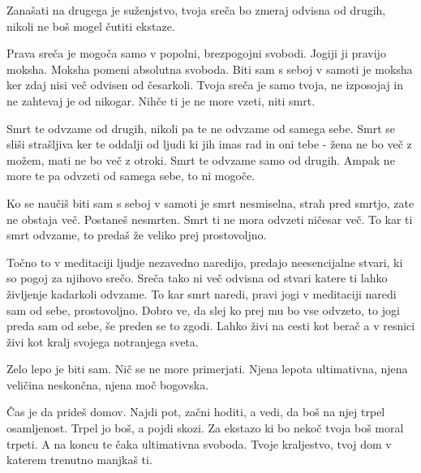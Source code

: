Zanašati na drugega je suženjstvo, tvoja sreča bo zmeraj odvisna od drugih, nikoli ne boš mogel čutiti ekstaze. 

Prava sreča je mogoča samo v popolni, brezpogojni svobodi. Jogiji ji pravijo moksha. Moksha pomeni absolutna svoboda. Biti sam s seboj v samoti je moksha ker zdaj nisi več odvisen od česarkoli. Tvoja sreča je samo tvoja, ne izposojaj in ne zahtevaj je od nikogar. Nihče ti je ne more vzeti, niti smrt. 

Smrt te odvzame od drugih, nikoli pa te ne odvzame od samega sebe. Smrt se sliši strašljiva ker te oddalji od ljudi ki jih imas rad in oni tebe - žena ne bo več z možem, mati ne bo več z otroki. Smrt te odvzame samo od drugih. Ampak ne more te pa odvzeti od samega sebe, to ni mogoče. 

Ko se naučiš biti sam s seboj v samoti je smrt nesmiselna, strah pred smrtjo, zate ne obstaja več. Postaneš nesmrten. Smrt ti ne mora odvzeti ničesar več. To kar ti smrt odvzame, to predaš že veliko prej prostovoljno. 

Točno to v meditaciji ljudje nezavedno naredijo, predajo neesencijalne stvari, ki so pogoj za njihovo srečo. Sreča tako ni več odvisna od stvari katere ti lahko življenje kadarkoli odvzame. To kar smrt naredi, pravi jogi v meditaciji naredi sam od sebe, prostovoljno. Dobro ve, da slej ko prej mu bo vse odvzeto, to jogi preda sam od sebe, še preden se to zgodi. Lahko živi na cesti kot berač a v resnici živi kot kralj svojega notranjega sveta. 

Zelo lepo je biti sam. Nič se ne more primerjati. Njena lepota ultimativna, njena veličina neskončna, njena moč bogovska. 

Čas je da prideš domov. Najdi pot, začni hoditi, a vedi, da boš na njej trpel osamljenost. Trpel jo boš, a pojdi skozi. Za ekstazo ki bo nekoč tvoja boš moral trpeti. A na koncu te čaka ultimativna svoboda. Tvoje kraljestvo, tvoj dom v katerem trenutno manjkaš ti. 